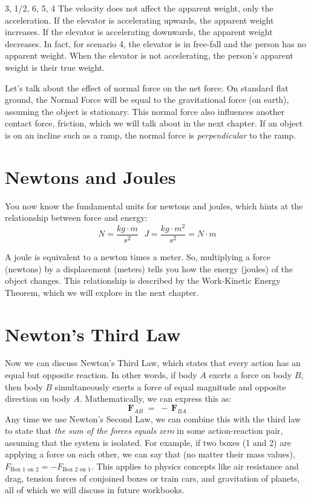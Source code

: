 \begin{Answer}[ref = elevator]
3, 1/2, 6, 5, 4
The velocity does not affect the apparent weight, only the acceleration. If the 
elevator is accelerating upwards, the apparent weight increases. If the elevator 
is accelerating downwards, the apparent weight decreases. In fact, for scenario 
4, the elevator is in free-fall and the person has no apparent weight. When the 
elevator is not accelerating, the person's apparent weight is their true weight. 
\end{Answer}

Let's talk about the effect of normal force on the net force. On standard flat ground, the Normal Force will be equal to the gravitational force (on earth), assuming the object is stationary. This normal force also influences another contact force, friction, which we will talk about in the next chapter. If an object is on an incline such as a ramp, the normal force is \emph{perpendicular} to the ramp.

\section{Newtons and Joules}
You now know the fundamental units for newtons and joules, which hints at the 
relationship between force and energy:
$$N = \frac{kg \cdot m}{s^2} \text{     } J = \frac{kg \cdot m^2}{s^2} = N \cdot m$$

A joule is equivalent to a newton times a meter. So, multiplying a force 
(newtons) by a displacement (meters) tells you how the energy (joules) of the 
object changes. This relationship is described by the Work-Kinetic Energy Theorem, 
which we will explore in the next chapter. 

\section{Newton's Third Law}
Now we can discuss Newton's Third Law, which states that every action has an equal but opposite reaction. 
In other words, if body \(A\) exerts a force on body \(B\), then body \(B\) simultaneously 
exerts a force of equal magnitude and opposite direction on body \(A\).
Mathematically, we can express this as:
\[
    \mathbf{F}_{\!AB} \;=\; -\,\mathbf{F}_{\!BA}
\]
Any time we use Newton's Second Law, we can combine this with the third law to state that 
\emph{the sum of the forces equals zero} in some action-reaction pair, assuming that the system is isolated. For example, if two boxes (1 and 2) are 
applying a force on each other, we can say that (no matter their mass values), $F_{\text{Box 1 on 2}} = -F_{\text{Box 2 on 1}}$.
This applies to physics concepts like air resistance and drag, tension forces of conjoined boxes or train cars, and gravitation 
of planets, all of which we will discuss in future workbooks. 

